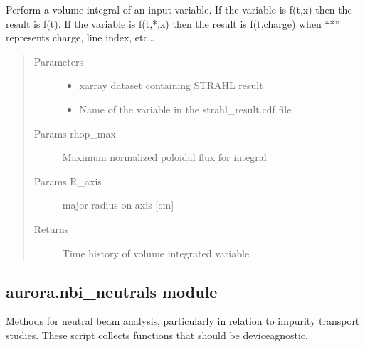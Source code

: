 \documentclass[letterpaper,10pt,english]{sphinxmanual}
\begin{document}

\begin{fulllineitems}
\label{\detokenize{aurora:aurora.particle_conserv.vol_int}}
Perform a volume integral of an input variable. If the variable is f(t,x) then the result is f(t).
If the variable is f(t,*,x) then the result is f(t,charge) when “*” represents charge, line index, etc…
\begin{quote}\begin{description}
\item[{Parameters}] \leavevmode\begin{itemize}
\item {} 
 \textendash{} xarray dataset containing STRAHL result

\item {} 
 \textendash{} Name of the variable in the strahl\_result.cdf file

\end{itemize}

\item[{Params rhop\_max}] \leavevmode
Maximum normalized poloidal flux for integral

\item[{Params R\_axis}] \leavevmode
major radius on axis {[}cm{]}

\item[{Returns}] \leavevmode
Time history of volume integrated variable

\end{description}\end{quote}

\end{fulllineitems}



\subsection{aurora.nbi\_neutrals module}
\label{\detokenize{aurora:module-aurora.nbi_neutrals}}\label{\detokenize{aurora:aurora-nbi-neutrals-module}}
Methods for neutral beam analysis, particularly in relation to impurity transport studies.
These script collects functions that should be device\sphinxhyphen{}agnostic.
\end{document}

